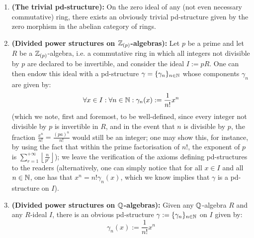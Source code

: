                 
            \begin{example}
                \noindent
                \begin{enumerate}
                    \item \textbf{(The trivial pd-structure):} On the zero ideal of any (not even necessary commutative) ring, there exists an obviously trivial pd-structure given by the zero morphism in the abelian category of rings. 
                    \item \textbf{(Divided power structures on $\mathbb{Z}_{(p)}$-algebras):} Let $p$ be a prime and let $R$ be a $\mathbb{Z}_{(p)}$-algebra, i.e. a commutative ring in which all integers not divisible by $p$ are declared to be invertible, and consider the ideal $I := pR$. One can then endow this ideal with a pd-structure $\gamma = \{\gamma_n\}_{n \in \mathbb{N}}$ whose components $\gamma_n$ are given by:
                        $$\forall x \in I: \forall n \in \mathbb{N}: \gamma_n(x) := \frac{1}{n!}x^n$$
                    (which we note, first and foremost, to be well-defined, since every integer not divisible by $p$ is invertible in $R$, and in the event that $n$ is divisible by $p$, the fraction $\frac{x^n}{n!} = \frac{(pa)^n}{n!}$ would still be an integer; one may show this, for instance, by using the fact that within the prime factorisation of $n!$, the exponent of $p$ is $\sum_{r=1}^{+\infty} \left\lfloor \frac{n}{p^r} \right\rfloor$); we leave the verification of the axioms defining pd-structures to the readers (alternatively, one can simply notice that for all $x \in I$ and all $n \in \mathbb{N}$, one has that $x^n = n!\gamma_n(x)$, which we know implies that $\gamma$ is a pd-structure on $I$).
                    \item \textbf{(Divided power structures on $\mathbb{Q}$-algebras):} Given any $\mathbb{Q}$-algebra $R$ and any $R$-ideal $I$, there is an obvious pd-structure $\gamma := \{\gamma_n\}_{n \in \mathbb{N}}$ on $I$ given by:
                        $$\gamma_n(x) := \frac{1}{n!} x^n$$
                \end{enumerate}
            \end{example}
            
